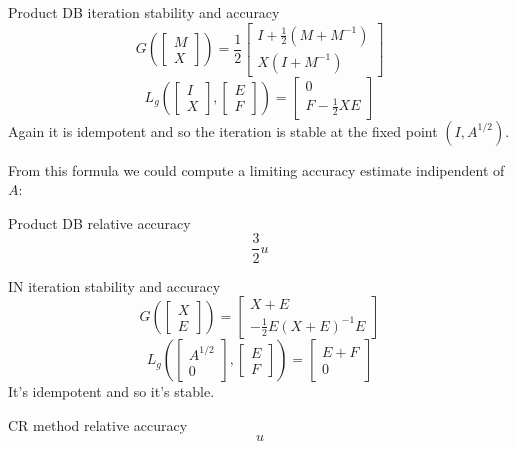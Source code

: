 \documentclass{beamer}
\theoremstyle{plain}
\theoremstyle{definition}
\theoremstyle{remark}
\newcommand{\pa}[1]{\left(#1\right)}
\newcommand{\bra}[1]{\left[#1\right]}
\begin{document}
\begin{frame}{Product DB iteration stability and accuracy}
  \[ G\pa{\bra{\begin{matrix}M\\X\end{matrix}}} = \frac{1}{2} \bra{
      \begin{matrix}
        I+ \frac{1}{2}\pa{M+M^{-1}} \\
        X\pa{I+M^{-1}}
      \end{matrix}} \]
  \[ L_g\pa{ \bra{ \begin{matrix}I\\X\end{matrix}},
      \bra{\begin{matrix}E\\F\end{matrix}}} = \bra{\begin{matrix}0\\
        F-\frac{1}{2}XE\end{matrix}} \]
  Again it is idempotent and so the iteration is stable at the fixed
  point $\pa{I,A^{1/2}}$. \vfill

  From this formula we could compute a limiting accuracy estimate
  indipendent of $A$:
  \begin{block}{Product DB relative accuracy}
    \[ \frac{3}{2}u \]
  \end{block}
\end{frame}

\begin{frame}{IN iteration stability and accuracy}
  \[ G\pa{\bra{\begin{matrix}X\\E\end{matrix}}} = \bra{
      \begin{matrix}
        X+E  \\
        -\frac{1}{2} E\pa{X+E}^{-1}E
      \end{matrix}} \]
  \[ L_g\pa{ \bra{ \begin{matrix}A^{1/2}\\0\end{matrix}},
      \bra{\begin{matrix}E\\F\end{matrix}}} = \bra{\begin{matrix}E+F\\
        0 \end{matrix}} \]
  It's idempotent and so it's stable. \vfill
  
  
  \begin{block}{CR method relative accuracy}
    \[ u \]
  \end{block}
\end{frame}
\end{document}
